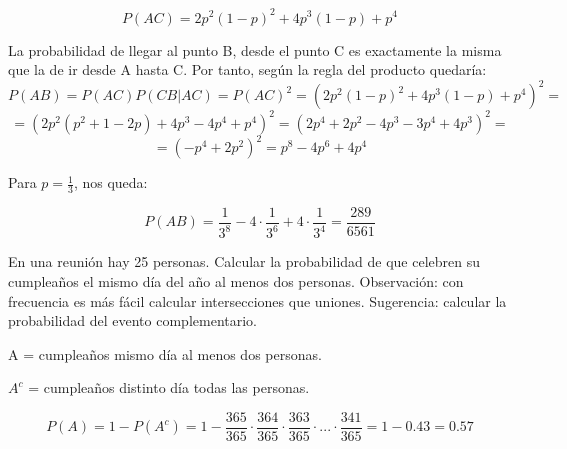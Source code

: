 \begin{problem}[8]
\[
P(AC)=2p^2(1-p)^2+4p^3(1-p)+p^4
\]

La probabilidad de llegar al punto B, desde el punto C es exactamente la misma que la de ir desde A hasta C. Por tanto, según la regla del producto quedaría:
\[
P(AB)=P(AC)P(CB|AC)=P(AC)^2=(2p^2(1-p)^2+4p^3(1-p)+p^4)^2=
\]
\[
=(2p^2(p^2+1-2p)+4p^3-4p^4+p^4)^2 = (2p^4 + 2p^2-4p^3-3p^4+4p^3)^2 =
\]
\[
=(-p^4+2p^2)^2=p^8-4p^6+4p^4
\]

Para $p=\frac{1}{3}$, nos queda:

\[
P(AB)=\frac{1}{3^8}-4\cdot\frac{1}{3^6}+4\cdot\frac{1}{3^4}=\frac{289}{6561}
\]



\end{problem}


\begin{problem}[9]En una reuni\'on hay 25 personas. Calcular la
probabilidad de que celebren su cumplea\~{n}os el mismo d\'ia del
a\~{n}o al menos dos personas. Observación: con frecuencia es m\'as f\'acil
calcular intersecciones que uniones. Sugerencia: calcular la probabilidad
del evento complementario.
\solution

\begin{expla}

\end{expla}

A = cumpleaños mismo día al menos dos personas.

$A^c$ = cumpleaños distinto día todas las personas.

\[
P(A)=1-P(A^c)=1-\frac{365}{365}\cdot\frac{364}{365}\cdot\frac{363}{365}\cdot...\cdot\frac{341}{365}=1-0.43=0.57
\]

\end{problem}


